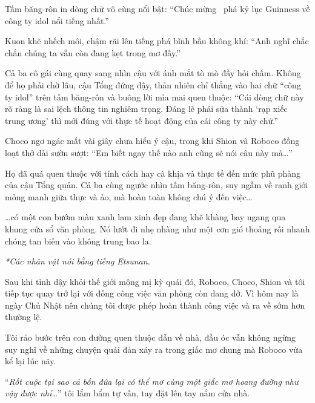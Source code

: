 \documentclass[../main.tex]{subfiles}
\begin{document}
Tấm băng-rôn in dòng chữ vô cùng nổi bật: ``Chúc mừng \hll\ phá kỷ lục Guinness về công ty idol nổi tiếng nhất.''


Kuon khẽ nhếch môi, chậm rãi lên tiếng phá bĩnh bầu không khí:
``Anh nghĩ chắc chắn chúng ta vẫn còn đang kẹt trong mơ đấy.''

Cả ba cô gái cùng quay sang nhìn cậu với ánh mắt tò mò đầy hỏi chấm. Không để họ phải chờ lâu, cậu Tổng đứng dậy, thản nhiên chỉ thẳng vào hai chữ ``công ty idol'' trên tấm băng-rôn và buông lời mỉa mai quen thuộc:
``Cái dòng chữ này rõ ràng là sai lệch thông tin nghiêm trọng. Đáng lẽ phải sửa thành `rạp xiếc trung ương' thì mới đúng với thực tế hoạt động của cái công ty này chứ.''

Choco ngơ ngác mất vài giây chưa hiểu ý cậu, trong khi Shion và Roboco đồng loạt thở dài sườn sượt:
``Em biết ngay thế nào anh cũng sẽ nói câu này mà\dots''

Họ đã quá quen thuộc với tính cách hay cà khịa và thực tế đến mức phũ phàng của cậu Tổng quản. Cả ba cùng ngước nhìn tấm băng-rôn, suy ngẫm về ranh giới mỏng manh giữa thực và ảo, mà hoàn toàn không chú ý đến việc\dots


\dots có một con bướm màu xanh lam xinh đẹp đang khẽ khàng bay ngang qua khung cửa sổ văn phòng. Nó lướt đi nhẹ nhàng như một cơn gió thoảng rồi nhanh chóng tan biến vào không trung bao la.

\omk

\begin{center}
  {\textit{*Các nhân vật nói bằng tiếng Etsunan.}}
\end{center}



Sau khi tỉnh dậy khỏi thế giới mộng mị kỳ quái đó, Roboco, Choco, Shion và tôi tiếp tục quay trở lại với đống công việc văn phòng còn dang dở. Vì hôm nay là ngày Chủ Nhật nên chúng tôi được phép hoàn thành công việc và ra về sớm hơn thường lệ.

Tôi rảo bước trên con đường quen thuộc dẫn về nhà, đầu óc vẫn không ngừng suy nghĩ về những chuyện quái đản xảy ra trong giấc mơ chung mà Roboco vừa kể lại lúc nãy.

``\textit{Rốt cuộc tại sao cả bốn đứa lại có thể mơ cùng một giấc mơ hoang đường như vậy được nhỉ\dots}'' tôi lẩm bẩm tự vấn, tay đặt lên tay nắm cửa nhà.
\end{document}
